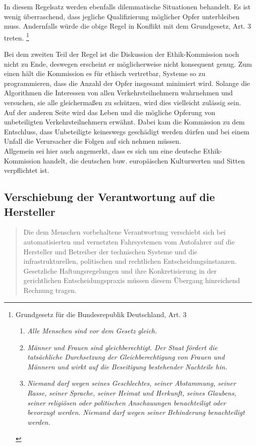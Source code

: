 \documentclass[twoside,a4paper,12pt]{article}
\begin{document}
In diesem Regelsatz werden ebenfalls dilemmatische Situationen behandelt. Es ist wenig überraschend, dass jegliche Qualifizierung möglicher Opfer unterbleiben muss. Andernfalls würde die obige Regel in Konflikt mit dem Grundgesetz, Art. 3 treten.
\footnote{Grundgesetz für die Bundesrepublik Deutschland, Art. 3
\begin{enumerate} 
\item \textit{Alle Menschen sind vor dem Gesetz gleich.}
\item \textit{Männer und Frauen sind gleichberechtigt. Der Staat fördert die tatsächliche Durchsetzung der Gleichberechtigung von Frauen und Männern und wirkt auf die Beseitigung bestehender Nachteile hin.}
\item\textit{ Niemand darf wegen seines Geschlechtes, seiner Abstammung, seiner Rasse, seiner Sprache, seiner Heimat und Herkunft, seines Glaubens, seiner religiösen oder politischen Anschauungen benachteiligt oder bevorzugt werden. Niemand darf wegen seiner Behinderung benachteiligt werden.}
\end{enumerate}}

Bei dem zweiten Teil der Regel ist die Diskussion der Ethik-Kommission noch nicht zu Ende, deswegen erscheint er möglicherweise nicht konsequent genug. 
Zum einen hält die Kommission es für ethisch vertretbar, Systeme so zu programmieren, dass die Anzahl der Opfer insgesamt minimiert wird. Solange die Algorithmen die Interessen von allen Verkehrsteilnehmern wahrnehmen und versuchen, sie alle gleichermaßen zu schützen, wird dies vielleicht zulässig sein. Auf der anderen Seite wird das Leben und die mögliche Opferung von unbeteiligten Verkehrsteilnehmern erwähnt. Dabei kam die Kommission zu dem Entschluss, dass Unbeteiligte keineswegs geschädigt werden dürfen und bei einem Unfall die Verursacher die Folgen auf sich nehmen müssen.\\

Allgemein sei hier auch angemerkt, dass es sich um eine deutsche Ethik-Kommission handelt, die deutschen buw. europäischen Kulturwerten und Sitten verpflichtet ist.\\

\subsection{Verschiebung der Verantwortung auf die Hersteller} \label{VerschiebungDerVerantwortungAufDieHersteller}

\begin{quote}
\glqq
Die dem Menschen vorbehaltene Verantwortung verschiebt sich bei automatisierten und
vernetzten Fahrsystemen vom Autofahrer auf die Hersteller und Betreiber der technischen Systeme und die infrastrukturellen, 
politischen und rechtlichen Entscheidungsinstanzen. Gesetzliche Haftungsregelungen und ihre Konkretisierung in der gerichtlichen
Entscheidungspraxis müssen diesem Übergang hinreichend Rechnung tragen.\grqq\mbox{~\cite[S. 11]{ek}}
\end{quote}
\end{document}
